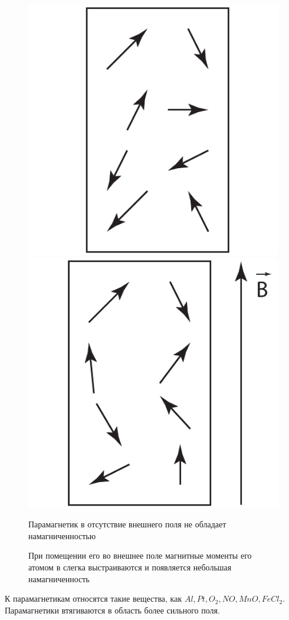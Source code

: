     \begin{figure}[h]
        \center
        \includegraphics[width=.47\textwidth]{lec09/para_wo_B.pdf}
        \hfill
        \includegraphics[width=.47\textwidth]{lec09/para_in_B.pdf}
        \parbox[t]{.47\textwidth}{\caption{Парамагнетик в отсутствие внешнего
            поля не обладает намагниченностью}}
        \hfill
        \parbox[t]{.47\textwidth}{\caption{При помещении его во внешнее поле
            магнитные моменты его атомом в слегка выстраиваются и появляется
            небольшая намагниченность}}
    \end{figure} 

    К парамагнетикам относятся такие вещества, как \( Al, Pt, O_2, NO, MnO,
    FeCl_2 \). Парамагнетики втягиваются в область более сильного поля.
    
